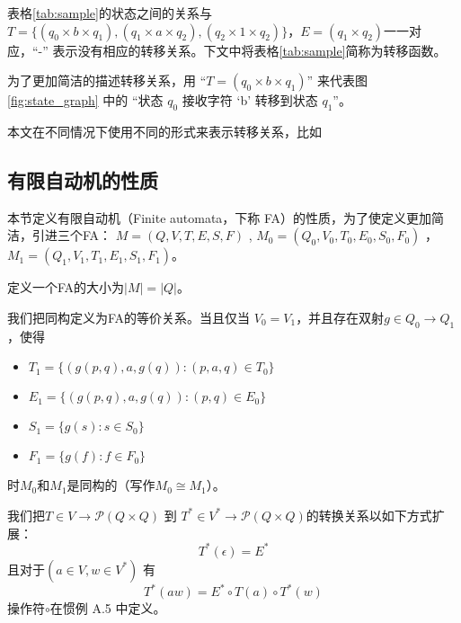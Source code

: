 表格\ref{tab:sample}的状态之间的关系与$T=\{(q_0 \times b \times q_1),(q_1\times a \times q_2),(q_2\times 1 \times q_2)\}$，$E=(q_1 \times q_2)$一一对应，“\mbox{-}” 表示没有相应的转移关系。下文中将表格\ref{tab:sample}简称为转移函数。

\begin{remark}[转移关系的表示]
    为了更加简洁的描述转移关系，用 “$T=(q_0 \times b \times q_1)$” 来代表图 \ref{fig:state_graph} 中的 “状态 $q_0$ 接收字符 ‘b’ 转移到状态 $q_1$”。
\end{remark}

\begin{remark}
    本文在不同情况下使用不同的形式来表示转移关系，比如
\end{remark}

\subsection{有限自动机的性质}

本节定义有限自动机（Finite automata，下称 FA）的性质，为了使定义更加简洁，引进三个FA： $M=(Q,V,T,E,S,F)$ , $M_0=(Q_0,V_0,T_0,E_0,S_0,F_0)$ ， $ M_1=(Q_1,V_1,T_1,E_1,S_1,F_1) $。

\begin{definition}[FA 的大小]
    定义一个FA的大小为$|M|=|Q|$。
\end{definition}

\begin{definition}
    我们把同构定义为FA的等价关系。当且仅当 $V_0=V_1$，并且存在双射$g\in Q_0 \longrightarrow Q_1$ ，使得
\begin{itemize}
    \item $T_1 = \{ (g(p,q),a,g(q)) : (p,a,q) \in T_0 \}$
    \item $E_1 = \{ (g(p,q),a,g(q)) : (p,q) \in E_0\}$
    \item $S_1 = \{ g(s):s\in S_0 \}$
    \item $F_1 = \{ g(f):f\in F_0 \}$
\end{itemize}
时$M_0$和$M_1$是同构的（写作$M_0 \cong M_1$）。
\end{definition}

\begin{definition}
    我们把$T \in V \longrightarrow \mathcal{P} (Q \times Q) $ 到 $ T^* \in V^* \longrightarrow \mathcal{P} (Q \times Q)  $的转换关系以如下方式扩展： 
    \[ 
        T^*(\epsilon) = E^* 
    \]
    且对于$(a\in V,w\in V^*)$ 有 
    \[ 
        T^*(aw) = E^* \circ T(a) \circ T^*(w)    
    \]
    操作符$\circ$在惯例 A.5 中定义。
\end{definition}

